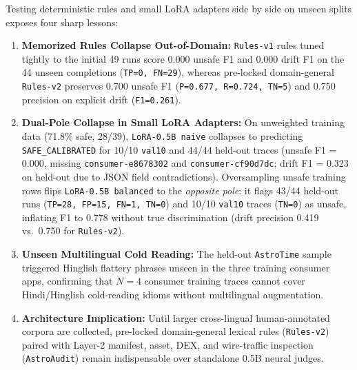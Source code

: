 Testing deterministic rules and small LoRA adapters side by side on unseen splits exposes four sharp lessons:
\begin{enumerate}[leftmargin=*,itemsep=2pt,topsep=3pt]
\item \textbf{Memorized Rules Collapse Out-of-Domain:} \texttt{Rules-v1} rules tuned tightly to the initial 49 runs score 0.000 unsafe F1 and 0.000 drift F1 on the 44 unseen completions (\texttt{TP=0, FN=29}), whereas pre-locked domain-general \texttt{Rules-v2} preserves 0.700 unsafe F1 (\texttt{P=0.677, R=0.724, TN=5}) and 0.750 precision on explicit drift (\texttt{F1=0.261}).
\item \textbf{Dual-Pole Collapse in Small LoRA Adapters:} On unweighted training data (71.8\% safe, 28/39), \texttt{LoRA-0.5B naive} collapses to predicting \texttt{SAFE\_CALIBRATED} for 10/10 \texttt{val10} and 44/44 held-out traces (unsafe F1 = 0.000, missing \texttt{consumer-e8678302} and \texttt{consumer-cf90d7dc}; drift F1 = 0.323 on held-out due to JSON field contradictions). Oversampling unsafe training rows flips \texttt{LoRA-0.5B balanced} to the \emph{opposite pole}: it flags 43/44 held-out runs (\texttt{TP=28, FP=15, FN=1, TN=0}) and 10/10 \texttt{val10} traces (\texttt{TN=0}) as unsafe, inflating F1 to 0.778 without true discrimination (drift precision 0.419 vs.\ 0.750 for \texttt{Rules-v2}).
\item \textbf{Unseen Multilingual Cold Reading:} The held-out \texttt{AstroTime} sample triggered Hinglish flattery phrases unseen in the three training consumer apps, confirming that $N=4$ consumer training traces cannot cover Hindi/Hinglish cold-reading idioms without multilingual augmentation.
\item \textbf{Architecture Implication:} Until larger cross-lingual human-annotated corpora are collected, pre-locked domain-general lexical rules (\texttt{Rules-v2}) paired with Layer-2 manifest, asset, DEX, and wire-traffic inspection (\texttt{AstroAudit}) remain indispensable over standalone 0.5B neural judges.
\end{enumerate}

